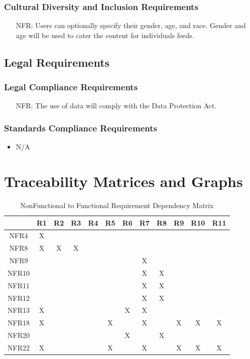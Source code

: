 \documentclass[12pt]{article}
\newcounter{nfrnum} %
\begin{document}
  \subsubsection{Cultural Diversity and Inclusion Requirements}
    \noindent \begin{itemize}
      \item[NFR\refstepcounter{nfrnum}\thenfrnum:]
        Users can optionally specify their gender, age, and race. Gender and age will be used to cater the content for individuals feeds.
    \end{itemize}

\subsection{Legal Requirements}
  \subsubsection{Legal Compliance Requirements}
    \noindent \begin{itemize}
      \item[NFR\refstepcounter{nfrnum}\thenfrnum:]
        The use of data will comply with the Data Protection Act.
    \end{itemize}
  \subsubsection{Standards Compliance Requirements}
    \noindent \begin{itemize}
      \item N/A
    \end{itemize}
	\section{Traceability Matrices and Graphs}
	
	\begin{table}[h!]
		\centering
		\begin{tabular}{|c|c|c|c|c|c|c|c|c|c|c|c|}
			\hline
			& R1 & R2 & R3 & R4 & R5 & R6 & R7 & R8 & R9 & R10 & R11 \\ \hline
			NFR4 &X & & & & & & & & & & \\ \hline
			NFR8 &X &X &X & & & & & & & & \\ \hline
			NFR9 & & & & & & &X & & & & \\ \hline %
			NFR10 & & & & & & &X &X & & & \\ \hline %
			NFR11 & & & & & & &X &X & & &\\ \hline %
			NFR12 & & & & & & &X &X & & & \\ \hline %
			NFR13 &X & & & & &X &X & & & & \\ \hline %
			NFR18 &X & & & &X & &X & &X &X &X \\ \hline %
			NFR20 & & & & & &X & &X & & & \\ \hline %
			NFR22 &X & & & &X & &X & &X &X &X \\ \hline %
		\end{tabular}
		\caption{NonFunctional to Functional Requirement Dependency Matrix}
		\label{Table:R_trace}
	\end{table}
\end{document}
